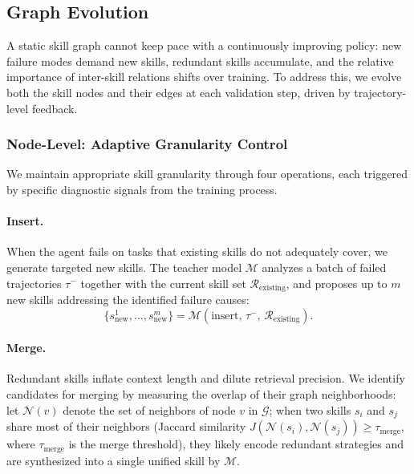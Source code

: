 \subsection{Graph Evolution}
\label{sec:evolution}

A static skill graph cannot keep pace with a continuously improving policy: new failure modes demand new skills, redundant skills accumulate, and the relative importance of inter-skill relations shifts over training. To address this, we evolve both the skill nodes and their edges at each validation step, driven by trajectory-level feedback.

\subsubsection{Node-Level: Adaptive Granularity Control}
\label{sec:granularity}

We maintain appropriate skill granularity through four operations, each triggered by specific diagnostic signals from the training process.

\paragraph{Insert.} When the agent fails on tasks that existing skills do not adequately cover, we generate targeted new skills. The teacher model $\mathcal{M}$ analyzes a batch of failed trajectories $\tau^-$ together with the current skill set $\mathcal{R}_{\text{existing}}$, and proposes up to $m$ new skills addressing the identified failure causes:
\begin{equation}
    \{s_{\text{new}}^1, \ldots, s_{\text{new}}^m\} = \mathcal{M}(\text{insert},\, \tau^-,\, \mathcal{R}_{\text{existing}}).
    \label{eq:skill_insert}
\end{equation}

\paragraph{Merge.} Redundant skills inflate context length and dilute retrieval precision. We identify candidates for merging by measuring the overlap of their graph neighborhoods: let $\mathcal{N}(v)$ denote the set of neighbors of node $v$ in $\mathcal{G}$; when two skills $s_i$ and $s_j$ share most of their neighbors (Jaccard similarity $J(\mathcal{N}(s_i), \mathcal{N}(s_j)) \geq \tau_{\text{merge}}$, where $\tau_{\text{merge}}$ is the merge threshold), they likely encode redundant strategies and are synthesized into a single unified skill by $\mathcal{M}$.

